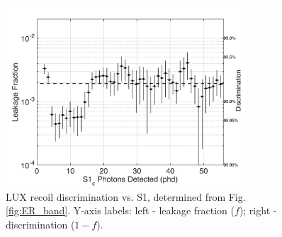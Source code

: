 \begin{figure}[h!]\centering
\includegraphics[width=90mm]{fig/CH3T_Leakage_Run03.png}
\caption{LUX recoil discrimination vs. S1, determined from Fig. \ref{fig:ER_band}. Y-axis labels: left -  leakage fraction ($f$); right - discrimination ($1-f$).}
\label{fig:Leak}
\end{figure}


